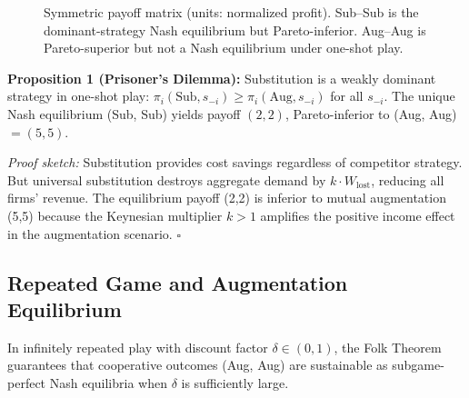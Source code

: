 \documentclass[conference]{IEEEtran}
\begin{document}
\begin{figure}[!ht]
\centering
{}
\caption{Symmetric payoff matrix (units: normalized profit).
Sub--Sub is the dominant-strategy Nash equilibrium but
Pareto-inferior. Aug--Aug is Pareto-superior but not a
Nash equilibrium under one-shot play.}
\label{fig:payoff}
\end{figure}

\textbf{Proposition 1 (Prisoner's Dilemma):}
Substitution is a weakly dominant strategy in one-shot
play: $\pi_i(\text{Sub}, s_{-i}) \geq
\pi_i(\text{Aug}, s_{-i})$ for all $s_{-i}$.
The unique Nash equilibrium (Sub, Sub) yields payoff
$(2,2)$, Pareto-inferior to (Aug, Aug) $= (5,5)$.

\textit{Proof sketch:}
Substitution provides cost savings regardless of
competitor strategy. But universal substitution
destroys aggregate demand by $k \cdot W_{\text{lost}}$,
reducing all firms' revenue. The equilibrium payoff
(2,2) is inferior to mutual augmentation (5,5) because
the Keynesian multiplier $k > 1$ amplifies the positive
income effect in the augmentation scenario. $\square$

\subsection{Repeated Game and Augmentation Equilibrium}

In infinitely repeated play with discount factor
$\delta \in (0,1)$, the Folk Theorem guarantees that
cooperative outcomes (Aug, Aug) are sustainable as
subgame-perfect Nash equilibria when $\delta$ is
sufficiently large.
\end{document}
